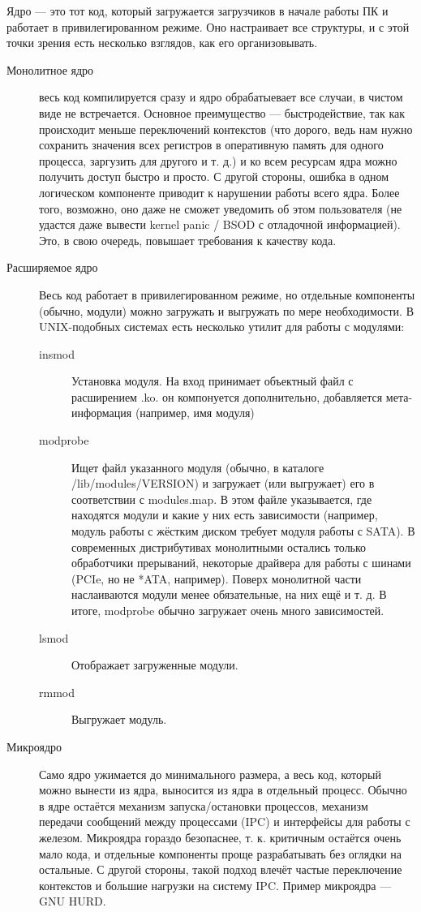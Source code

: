 \documentclass[main]{subfiles}
\begin{document}
Ядро --- это тот код, который загружается загрузчиков в начале работы ПК
и работает в привилегированном режиме. Оно настраивает все структуры, и с
этой точки зрения есть несколько взглядов, как его организовывать.
\begin{description}
\item[Монолитное ядро] весь код компилируется сразу и ядро обрабатыевает
все случаи, в чистом виде не встречается. Основное преимущество ---
быстродействие, так как происходит меньше переключений контекстов
(что дорого, ведь нам нужно сохранить значения всех регистров в оперативную
память для одного процесса, заргузить для другого и т. д.)
и ко всем ресурсам ядра можно получить доступ быстро и просто.
С другой стороны, ошибка в одном логическом компоненте приводит к нарушении
работы всего ядра. Более того, возможно, оно даже не сможет уведомить об этом
пользователя (не удастся даже вывести kernel panic / BSOD с отладочной
информацией). Это, в свою очередь, повышает требования к качеству кода.
\item[Расширяемое ядро] Весь код работает в привилегированном режиме, но
отдельные компоненты (обычно, модули) можно загружать и выгружать по мере
необходимости. В UNIX-подобных системах есть несколько утилит для работы с
модулями:
\begin{description}
\item[insmod] Установка модуля. На вход принимает объектный файл с расширением
.ko. он
компонуется дополнительно, добавляется мета-информация (например, имя модуля)
\item[modprobe] Ищет файл указанного модуля (обычно, в каталоге
/lib/modules/VERSION) и загружает (или выгружает) его в соответствии с modules.map. В этом
файле указывается, где находятся модули и какие у них есть зависимости
(например, модуль работы с жёстким диском требует модуля работы с SATA).
В современных дистрибутивах монолитными остались только обработчики прерываний,
некоторые драйвера для работы с шинами (PCIe, но не *ATA, например).
Поверх монолитной части наслаиваются модули менее обязательные, на них ещё
и т. д. В итоге, modprobe обычно загружает очень много зависимостей.
\item[lsmod] Отображает загруженные модули.
\item[rmmod] Выгружает модуль.
\end{description}
\item[Микроядро] Само ядро ужимается до минимального размера, а весь код,
который можно вынести из ядра, выносится из ядра в отдельный процесс. Обычно
в ядре остаётся механизм запуска/остановки процессов, механизм передачи
сообщений между процессами (IPC) и интерфейсы для работы с железом.
Микроядра гораздо безопаснее, т. к. критичным остаётся очень мало кода, и
отдельные компоненты проще разрабатывать без оглядки на остальные.
С другой стороны, такой подход влечёт частые переключение контекстов и
большие нагрузки на систему IPC.
Пример микроядра --- GNU HURD.
\end{description}
\end{document}
